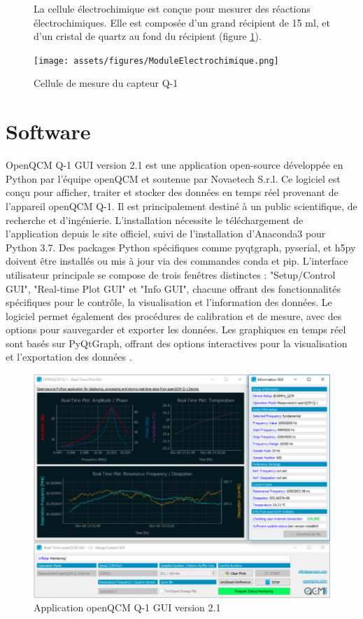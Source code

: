 \begin{figure}[H]
    \centering
    \begin{minipage}{0.48\textwidth}
        \small
    La cellule électrochimique est conçue pour mesurer des réactions électrochimiques.
    Elle est composée d'un grand récipient de 15 ml, et d'un cristal de quartz au fond du récipient (figure \ref{fig:cellule electrolitique Q-1}).
    \end{minipage}\hfill
    \begin{minipage}{0.48\textwidth}
        \centering
        \texttt{[image: assets/figures/ModuleElectrochimique.png]}
        \caption{Cellule de mesure du capteur Q-1}
        \label{fig:cellule electrolitique Q-1}
    \end{minipage}
\end{figure}

\section{Software}
OpenQCM Q-1 GUI version 2.1 est une application open-source développée en Python par l'équipe openQCM et soutenue par Novaetech S.r.l. Ce logiciel est conçu pour afficher, traiter et stocker des données en temps réel provenant de l'appareil openQCM Q-1. Il est principalement destiné à un public scientifique, de recherche et d'ingénierie. L'installation nécessite le téléchargement de l'application depuis le site officiel, suivi de l'installation d'Anaconda3 pour Python 3.7. Des packages Python spécifiques comme pyqtgraph, pyserial, et h5py doivent être installés ou mis à jour via des commandes conda et pip. L'interface utilisateur principale se compose de trois fenêtres distinctes : "Setup/Control GUI", "Real-time Plot GUI" et "Info GUI", chacune offrant des fonctionnalités spécifiques pour le contrôle, la visualisation et l'information des données. Le logiciel permet également des procédures de calibration et de mesure, avec des options pour sauvegarder et exporter les données. Les graphiques en temps réel sont basés sur PyQtGraph, offrant des options interactives pour la visualisation et l'exportation des données \cite{manual-openqcmQ1}.

\begin{figure}[H]
    \centering
    \includegraphics[width=\textwidth]{assets/figures/QCM-GUI.png}
    \caption{Application openQCM Q-1 GUI version 2.1\cite{manual-openqcmQ1}}
    \label{fig:QCM-GUI}
\end{figure}